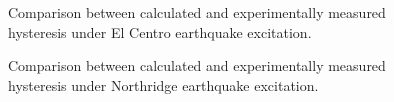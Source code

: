\begin{figure}[H]
\centering
{}
\caption{Comparison between calculated and experimentally measured hysteresis under El Centro earthquake excitation.}
\label{fig:8-11}
\end{figure}

\begin{figure}[H]
\centering
{}
\caption{Comparison between calculated and experimentally measured hysteresis under Northridge earthquake excitation.}
\label{fig:8-12}
\end{figure}

